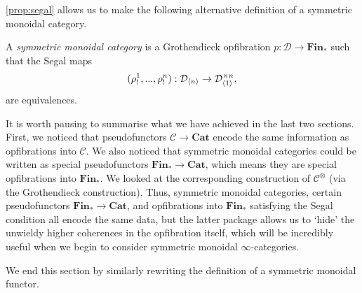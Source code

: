 \documentclass{MetricNotes2023}
\begin{document}
\ref{prop:segal} allows us to make the following alternative definition of a symmetric monoidal category.

\begin{definition}\label{def:newmonoidal}
A \textit{symmetric monoidal category} is a Grothendieck opfibration \(p : \mathcal{D}\to \textbf{Fin}_*\) such that the Segal maps
\[(\rho_!^1, ..., \rho_!^n) : \mathcal{D}_{\langle n\rangle}\to \mathcal{D}_{\langle1\rangle}^{\times n},\]
are equivalences.
\end{definition}

It is worth pausing to summarise what we have achieved in the last two sections. First, we noticed that pseudofunctors \(\mathcal{C}\to \textbf{Cat}\) encode the same information as opfibrations into \(\mathcal{C}\). We also noticed that symmetric monoidal categories could be written as special pseudofunctors \(\textbf{Fin}_* \to \textbf{Cat}\), which means they are special opfibrations into \(\textbf{Fin}_*\). We looked at the corresponding construction of \(\mathcal{C}^\otimes\) (via the Grothendieck construction). Thus, symmetric monoidal categories, certain pseudofunctors \(\textbf{Fin}_* \to \textbf{Cat}\), and opfibrations into \(\textbf{Fin}_*\) satisfying the Segal condition all encode the same data, but the latter package allows us to `hide' the unwieldy higher coherences in the opfibration itself, which will be incredibly useful when we begin to consider symmetric monoidal \(\infty\)-categories.

We end this section by similarly rewriting the definition of a symmetric monoidal functor. 
\end{document}
